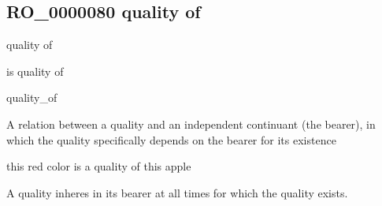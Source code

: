 \documentclass[letterpaper,10pt,english]{sphinxmanual}
\begin{document}
\begin{sphinxShadowBox}

\sphinxAtStartPar
{}
\end{sphinxShadowBox}
\begin{quote}

\ignorespaces \end{quote}


\subsection{RO\_0000080 \sphinxhyphen{} quality of}
\label{\detokenize{doc-RO_0000080:ro-0000080-quality-of}}\label{\detokenize{doc-RO_0000080:index-0}}\label{\detokenize{doc-RO_0000080::doc}}
\begin{sphinxShadowBox}

\sphinxAtStartPar
quality of
\end{sphinxShadowBox}

\begin{sphinxShadowBox}

\sphinxAtStartPar
is quality of

\sphinxAtStartPar
quality\_of
\end{sphinxShadowBox}

\begin{sphinxShadowBox}

\sphinxAtStartPar
A relation between a quality and an independent continuant (the bearer), in which the quality specifically depends on the bearer for its existence
\end{sphinxShadowBox}

\begin{sphinxShadowBox}

\sphinxAtStartPar
this red color is a quality of this apple
\end{sphinxShadowBox}

\begin{sphinxShadowBox}

\sphinxAtStartPar
A quality inheres in its bearer at all times for which the quality exists.
\end{sphinxShadowBox}
\end{document}
